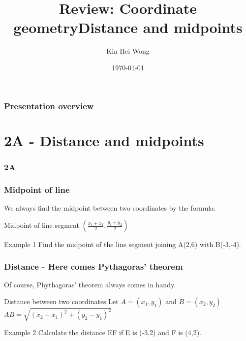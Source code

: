 \documentclass{beamer}
\title{Review: Coordinate geometry}
\author{Kin Hei Wong}
\date{\today}
\begin{document}
\begin{frame}
    \titlepage
\end{frame}

\begin{frame}
    \frametitle{Presentation overview}
    \tableofcontents
\end{frame}

\section{2A - Distance and midpoints}
\begin{frame}
    \frametitle{2A}
    \begin{center}
        \title{Distance and midpoints}
        \maketitle
    \end{center}
\end{frame}

\begin{frame}[t]
    \frametitle{Midpoint of line}
    We always find the midpoint between two coordinates by the formula:\\
    \begin{block}{Midpoint of line segment}
        $(\frac{x_1 + x_2}{2}, \frac{y_1 + y_2}{2})$
    \end{block}
    \begin{block}{Example 1}
        Find the midpoint of the line segment joining A(2,6) with B(-3,-4).
    \end{block}
\end{frame}

\begin{frame}[t]
    \frametitle{Distance - Here comes Pythagoras' theorem}
    Of course, Phythagoras' theorem always comes in handy.
    \begin{block}{Distance between two coordinates}
        Let $A = (x_1, y_1)$ and $B = (x_2, y_2)$\\
        $AB = \sqrt{(x_2 - x_1)^2 + (y_2 - y_1)^2}$
    \end{block}
    \begin{block}{Example 2}
        Calculate the distance EF if E is (-3,2) and F is (4,2).
    \end{block}
\end{frame}
\end{document}
